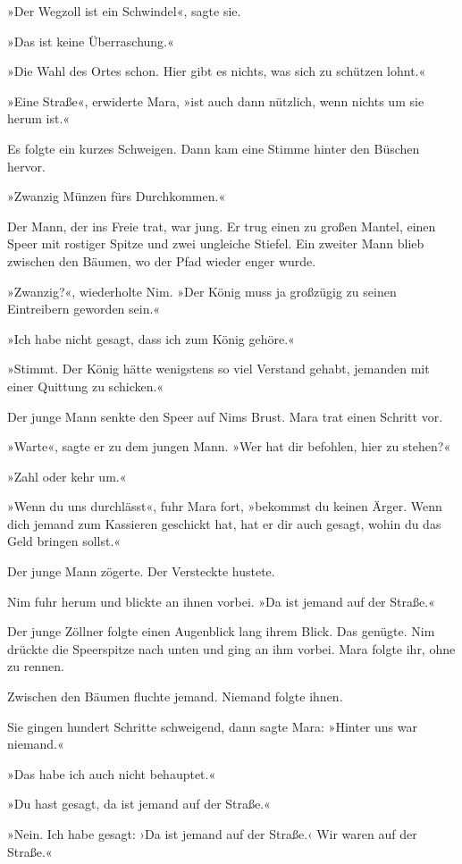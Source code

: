 \documentclass[10pt,a4paper]{article}
\begin{document}
»Der Wegzoll ist ein Schwindel«, sagte sie.

»Das ist keine Überraschung.«

»Die Wahl des Ortes schon. Hier gibt es nichts, was sich zu schützen lohnt.«

»Eine Straße«, erwiderte Mara, »ist auch dann nützlich, wenn nichts um sie herum ist.«

Es folgte ein kurzes Schweigen. Dann kam eine Stimme hinter den Büschen hervor.

»Zwanzig Münzen fürs Durchkommen.«

Der Mann, der ins Freie trat, war jung. Er trug einen zu großen Mantel, einen Speer mit rostiger Spitze und zwei ungleiche Stiefel. Ein zweiter Mann blieb zwischen den Bäumen, wo der Pfad wieder enger wurde.

»Zwanzig?«, wiederholte Nim. »Der König muss ja großzügig zu seinen Eintreibern geworden sein.«

»Ich habe nicht gesagt, dass ich zum König gehöre.«

»Stimmt. Der König hätte wenigstens so viel Verstand gehabt, jemanden mit einer Quittung zu schicken.«

Der junge Mann senkte den Speer auf Nims Brust. Mara trat einen Schritt vor.

»Warte«, sagte er zu dem jungen Mann. »Wer hat dir befohlen, hier zu stehen?«

»Zahl oder kehr um.«

»Wenn du uns durchlässt«, fuhr Mara fort, »bekommst du keinen Ärger. Wenn dich jemand zum Kassieren geschickt hat, hat er dir auch gesagt, wohin du das Geld bringen sollst.«

Der junge Mann zögerte. Der Versteckte hustete.

Nim fuhr herum und blickte an ihnen vorbei. »Da ist jemand auf der Straße.«

Der junge Zöllner folgte einen Augenblick lang ihrem Blick. Das genügte. Nim drückte die Speerspitze nach unten und ging an ihm vorbei. Mara folgte ihr, ohne zu rennen.

Zwischen den Bäumen fluchte jemand. Niemand folgte ihnen.

Sie gingen hundert Schritte schweigend, dann sagte Mara: »Hinter uns war niemand.«

»Das habe ich auch nicht behauptet.«

»Du hast gesagt, da ist jemand auf der Straße.«

»Nein. Ich habe gesagt: ›Da ist jemand auf der Straße.‹ Wir waren auf der Straße.«
\end{document}
